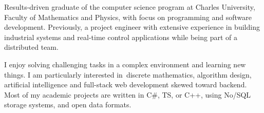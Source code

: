 Results-driven graduate of the computer science program at Charles University, Faculty of Mathematics and Physics, with focus on programming and software development. Previously, a project engineer with extensive experience in building industrial systems and real-time control applications while being part of a distributed team.

I enjoy solving challenging tasks in a complex environment and learning new things. I am particularly interested in~dis\-crete mathematics, algorithm design, artificial intelligence and full-stack web development skewed toward backend. Most of my academic projects are written in C\#, TS, or C++, using No/SQL storage systems, and open data formats.
